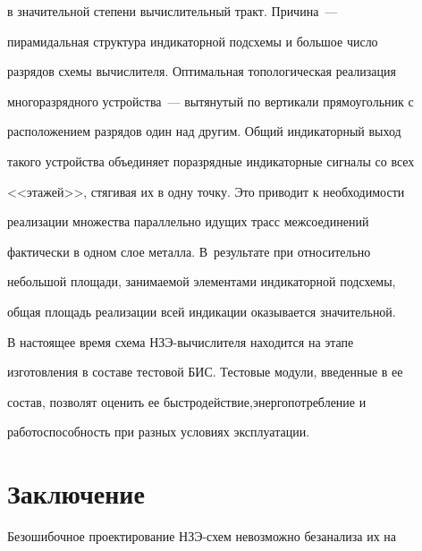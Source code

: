 в значительной степени вы\-чис\-ли\-тель\-ный тракт. Причина~---


пирамидальная структура индикаторной подсхемы и большое чис\-ло


разрядов схемы вы\-чис\-ли\-те\-ля. Оптимальная топологическая реализация


многоразрядного устрой\-ст\-ва~--- вытянутый по вертикали прямоугольник с


расположением разрядов один над другим. Общий индикаторный выход


такого устройства объединяет поразрядные индикаторные сигналы со всех


<<этажей>>, стягивая их в одну точку. Это приводит к необходимости


реализации множества параллельно идущих трасс межсоединений


фактически в одном слое металла. В~результате при относительно


небольшой площади, за\-ни\-ма\-емой элементами индикаторной подсхемы,


общая площадь реализации всей индикации оказывается значительной.





   В настоящее время схема НЗЭ-вы\-чис\-ли\-те\-ля находится на этапе


изготовления в составе тестовой БИС. Тестовые модули, введенные в ее


состав, позволят оценить ее быстродействие,\linebreak  энергопотребление и


работоспособность при разных условиях эксплуатации.










   \section{Заключение}


   







   Безошибочное проектирование НЗЭ-схем невозможно без\linebreak  анализа их на


